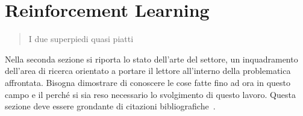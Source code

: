 \chapter{Reinforcement Learning}
\label{ch:rl}
\thispagestyle{empty}

\begin{quotation}
{\footnotesize
{}
\begin{flushright}
I due superpiedi quasi piatti
\end{flushright}
}
\end{quotation}
\vspace{0.5cm}

\noindent Nella seconda sezione si riporta lo stato dell'arte del settore, un inquadramento dell'area di ricerca orientato a portare il lettore all'interno della problematica affrontata. Bisogna dimostrare di conoscere le cose fatte fino ad ora in questo campo e il perch\'e si sia reso necessario lo svolgimento di questo lavoro. Questa sezione deve essere grondante di citazioni bibliografiche~\cite{marco02bud}.

